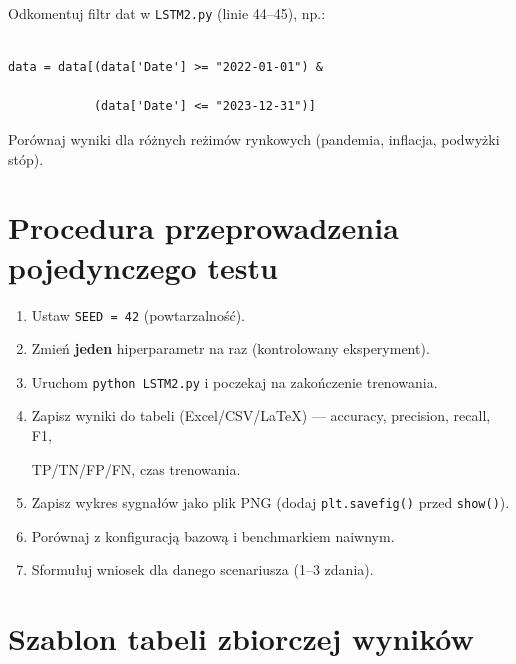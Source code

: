 \documentclass[12pt,a4paper]{report}
\begin{document}
Odkomentuj filtr dat w \texttt{LSTM2.py} (linie 44--45), np.:

\begin{lstlisting}

data = data[(data['Date'] >= "2022-01-01") &

            (data['Date'] <= "2023-12-31")]

\end{lstlisting}

Porównaj wyniki dla różnych reżimów rynkowych (pandemia, inflacja, podwyżki stóp).



\section{Procedura przeprowadzenia pojedynczego testu}



\begin{enumerate}

    \item Ustaw \texttt{SEED = 42} (powtarzalność).

    \item Zmień \textbf{jeden} hiperparametr na raz (kontrolowany eksperyment).

    \item Uruchom \texttt{python LSTM2.py} i poczekaj na zakończenie trenowania.

    \item Zapisz wyniki do tabeli (Excel/CSV/LaTeX) --- accuracy, precision, recall, F1,

          TP/TN/FP/FN, czas trenowania.

    \item Zapisz wykres sygnałów jako plik PNG (dodaj \texttt{plt.savefig()} przed \texttt{show()}).

    \item Porównaj z konfiguracją bazową i benchmarkiem naiwnym.

    \item Sformułuj wniosek dla danego scenariusza (1--3 zdania).

\end{enumerate}



\section{Szablon tabeli zbiorczej wyników}
\end{document}
